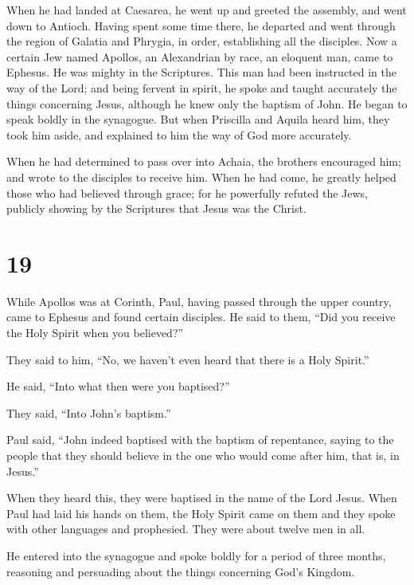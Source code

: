 When he had landed at Caesarea, he went up and greeted the
assembly, and went down to Antioch.  Having spent some time
there, he departed and went through the region of Galatia and Phrygia,
in order, establishing all the disciples.  Now a certain
Jew named Apollos, an Alexandrian by race, an eloquent man, came to
Ephesus. He was mighty in the Scriptures.  This man had
been instructed in the way of the Lord; and being fervent in spirit, he
spoke and taught accurately the things concerning Jesus, although he
knew only the baptism of John.  He began to speak boldly in
the synagogue. But when Priscilla and Aquila heard him, they took him
aside, and explained to him the way of God more accurately.

 When he had determined to pass over into Achaia, the
brothers encouraged him; and wrote to the disciples to receive him. When
he had come, he greatly helped those who had believed through grace;
 for he powerfully refuted the Jews, publicly showing by
the Scriptures that Jesus was the Christ.

\hypertarget{section-18}{%
\section{19}\label{section-18}}

 While Apollos was at Corinth, Paul, having passed through
the upper country, came to Ephesus and found certain disciples.
 He said to them, ``Did you receive the Holy Spirit when you
believed?''

They said to him, ``No, we haven't even heard that there is a Holy
Spirit.''

 He said, ``Into what then were you baptised?''

They said, ``Into John's baptism.''

 Paul said, ``John indeed baptised with the baptism of
repentance, saying to the people that they should believe in the one who
would come after him, that is, in Jesus.''

 When they heard this, they were baptised in the name of the
Lord Jesus.  When Paul had laid his hands on them, the Holy
Spirit came on them and they spoke with other languages and prophesied.
 They were about twelve men in all.

 He entered into the synagogue and spoke boldly for a period
of three months, reasoning and persuading about the things concerning
God's Kingdom.

